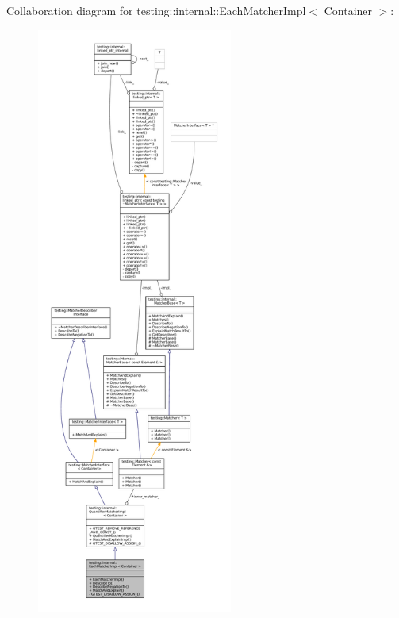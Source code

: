 Collaboration diagram for testing\+:\+:internal\+:\+:Each\+Matcher\+Impl$<$ Container $>$\+:
\nopagebreak
\begin{figure}[H]
\begin{center}
\leavevmode
\includegraphics[height=550pt]{classtesting_1_1internal_1_1EachMatcherImpl__coll__graph}
\end{center}
\end{figure}
